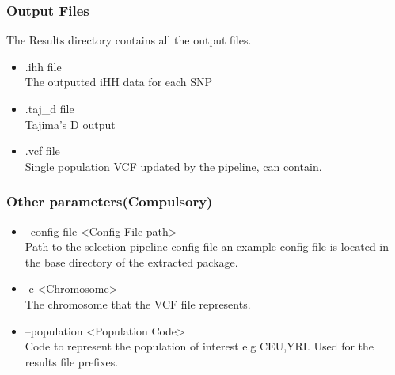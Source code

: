 \documentclass[a4paper,10pt]{article}
\begin{document}
                             \subsubsection{Output Files}
                             The Results directory contains all the output files.
                             \begin{itemize}
                             \item .ihh file\\
                             The outputted iHH data for each SNP
                             \item .taj\_d file\\
                             Tajima's D output
                             \item .vcf file\\
                             Single population VCF updated by the pipeline, can contain.
                             \end{itemize}
                             \subsubsection{Other parameters(Compulsory)}
                             \begin{itemize}
                             \item --config-file <Config File path>\\
                             Path to the selection pipeline config file an example config file is located in the base directory of the extracted package.
                             \item -c <Chromosome>\\
                             The chromosome that the VCF file represents.
                             \item --population <Population Code>\\
                             Code to represent the population of interest e.g CEU,YRI. Used for the results file prefixes.

                             \end{itemize}
\end{document}
